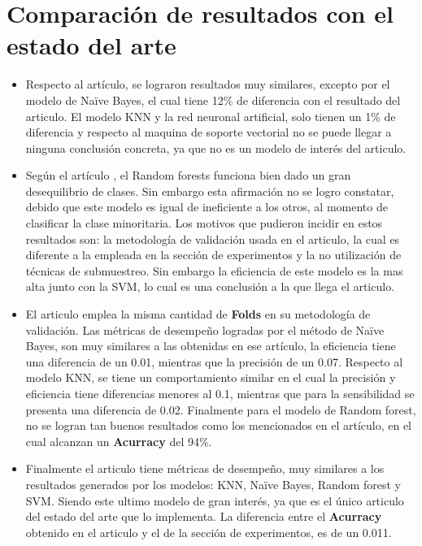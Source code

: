 \documentclass[conference]{IEEEtran}
\begin{document}
\section{Comparación de resultados con el estado del arte}
\begin{itemize}
\item Respecto al artículo\cite{articulo1}, se lograron resultados muy similares, excepto por el modelo de Naïve Bayes, el cual tiene 12\% de diferencia con el resultado del articulo. El modelo KNN y la red neuronal artificial, solo tienen un 1\% de diferencia y respecto al maquina de soporte vectorial no se puede llegar a ninguna conclusión concreta, ya que no es un modelo de interés del articulo. 

\item Según el artículo \cite{articulo2}, el Random forests funciona bien dado un gran desequilibrio de clases. Sin embargo esta afirmación no se logro constatar, debido que este modelo es igual de ineficiente a los otros, al momento de clasificar la clase minoritaria. Los motivos que pudieron incidir en estos resultados son: la metodología de validación usada en el articulo, la cual es diferente a la empleada en la sección de experimentos y la no utilización de técnicas de submuestreo. Sin embargo la eficiencia de este modelo es la mas alta junto con la SVM, lo cual es una conclusión a la que llega el articulo.

\item El articulo \cite{articulo3} emplea la misma cantidad de \textbf{Folds} en su metodología de validación. Las métricas de desempeño logradas por el método de Naïve Bayes, son muy similares a las obtenidas en ese artículo, la eficiencia tiene una diferencia de un 0.01, mientras que la precisión de un 0.07. Respecto al modelo KNN, se tiene un comportamiento similar en el cual la precisión y eficiencia tiene diferencias menores al 0.1, mientras que para la sensibilidad se presenta una diferencia de 0.02. Finalmente para el modelo de Random forest, no se logran tan buenos resultados como los mencionados en el artículo, en el cual alcanzan un  \textbf{Acurracy} del 94\%.

\item Finalmente el articulo  \cite{articulo4} tiene métricas de desempeño, muy similares a los resultados generados por los modelos: KNN, Naïve Bayes, Random forest y SVM. Siendo este ultimo modelo de gran interés, ya que es el único articulo del estado del arte que lo implementa. La diferencia entre el \textbf{Acurracy} obtenido en el articulo y el de la sección de experimentos, es de un 0.011.

\end{itemize}
\end{document}
